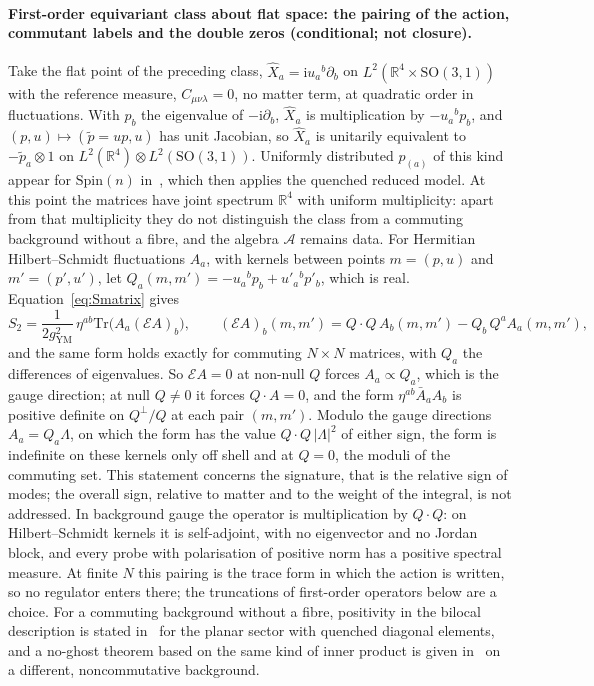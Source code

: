\paragraph{First-order equivariant class about flat space: the pairing of the action, commutant labels and the double zeros (conditional; not closure).}
Take the flat point of the preceding class, \(\hat X_a=\mathrm iu_a{}^b\partial_b\) on \(L^2(\mathbb R^4\times\mathrm{SO}(3,1))\) with the reference measure, \(C_{\mu\nu\lambda}=0\), no matter term, at quadratic order in fluctuations. With \(p_b\) the eigenvalue of \(-\mathrm i\partial_b\), \(\hat X_a\) is multiplication by \(-u_a{}^bp_b\), and \((p,u)\mapsto(\tilde p=up,u)\) has unit Jacobian, so \(\hat X_a\) is unitarily equivalent to \(-\tilde p_a\otimes1\) on \(L^2(\mathbb R^4)\otimes L^2(\mathrm{SO}(3,1))\). Uniformly distributed \(p_{(a)}\) of this kind appear for \(\mathrm{Spin}(n)\) in~\cite{Hanada2006}, which then applies the quenched reduced model. At this point the matrices have joint spectrum \(\mathbb R^4\) with uniform multiplicity: apart from that multiplicity they do not distinguish the class from a commuting background without a fibre, and the algebra \(\mathcal A\) remains data. For Hermitian Hilbert--Schmidt fluctuations \(A_a\), with kernels between points \(m=(p,u)\) and \(m'=(p',u')\), let \(Q_a(m,m')=-u_a{}^bp_b+u'_a{}^bp'_b\), which is real. Equation~\eqref{eq:Smatrix} gives
\[
S_2=\frac1{2g_{\mathrm{YM}}^2}\,\eta^{ab}\mathrm{Tr}\bigl(A_a(\mathcal EA)_b\bigr),\qquad
(\mathcal EA)_b(m,m')=Q\cdot Q\,A_b(m,m')-Q_b\,Q^aA_a(m,m'),
\]
and the same form holds exactly for commuting \(N\times N\) matrices, with \(Q_a\) the differences of eigenvalues. So \(\mathcal EA=0\) at non-null \(Q\) forces \(A_a\propto Q_a\), which is the gauge direction; at null \(Q\neq0\) it forces \(Q\cdot A=0\), and the form \(\eta^{ab}\bar A_aA_b\) is positive definite on \(Q^\perp/Q\) at each pair \((m,m')\). Modulo the gauge directions \(A_a=Q_a\Lambda\), on which the form has the value \(Q\cdot Q\,|\Lambda|^2\) of either sign, the form is indefinite on these kernels only off shell and at \(Q=0\), the moduli of the commuting set. This statement concerns the signature, that is the relative sign of modes; the overall sign, relative to matter and to the weight of the integral, is not addressed. In background gauge the operator is multiplication by \(Q\cdot Q\): on Hilbert--Schmidt kernels it is self-adjoint, with no eigenvector and no Jordan block, and every probe with polarisation of positive norm has a positive spectral measure. At finite \(N\) this pairing is the trace form in which the action is written, so no regulator enters there; the truncations of first-order operators below are a choice. For a commuting background without a fibre, positivity in the bilocal description is stated in~\cite{HoKawaiSteinacker2025} for the planar sector with quenched diagonal elements, and a no-ghost theorem based on the same kind of inner product is given in~\cite{Steinacker2019NoGhost} on a different, noncommutative background.

